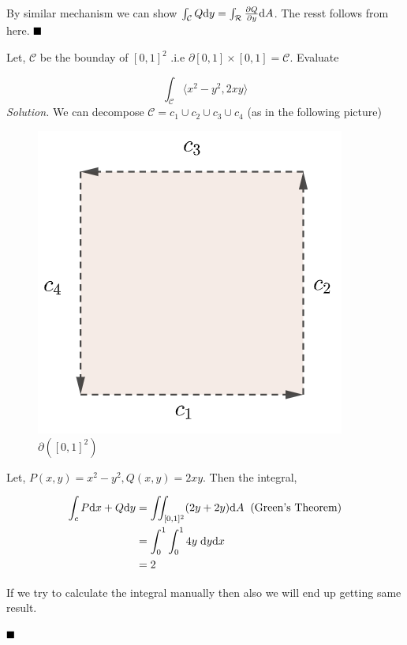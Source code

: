 \documentclass[Analysis-3]{subfiles}
\begin{document}
 By similar mechanism we can show $\int_{\mathcal{C}} Q \dd y = \int_{\mathcal{R}} \pdv{Q}{y} \dd A$. The resst follows from here. $\hfill \blacksquare$
\pagebreak
\begin{Eg}{}{}
    Let, $\mathcal{C}$ be the bounday of $[0,1]^2$ .i.e $\partial [0,1]\times[0,1] = \mathcal{C}$. Evaluate

    \[\int_{\mathcal{C}} \langle x^2-y^2,2xy \rangle\]
    \textit{Solution.} We can decompose $\mathcal{C} = c_1 \cup c_2 \cup c_3 \cup c_4$ (as in the following picture)

    \begin{figure}
        \centering
        \includegraphics[width=.78\linewidth]{figures/lec-28.2.png}
        \caption{$\partial( [0,1]^2)$}
    \end{figure}
    
    Let, $P(x,y) = x^2 - y^2, Q(x,y) = 2xy$. Then the integral, 
    
    \begin{align*}
        \int_c P \dd x + Q \dd y &= \iint_{[0,1]^2} (2y + 2y) \dd A \hspace{0.2cm} \text{(Green's Theorem)}\\
        &= \int_{0}^1 \int_0^1 4y \hspace{0.1cm} \dd y \dd x \\
        &= 2
    \end{align*}
    
    If we try to calculate the integral manually then also we will end up getting same result.
    
    $\hfill \blacksquare$
\end{Eg}
\end{document}
